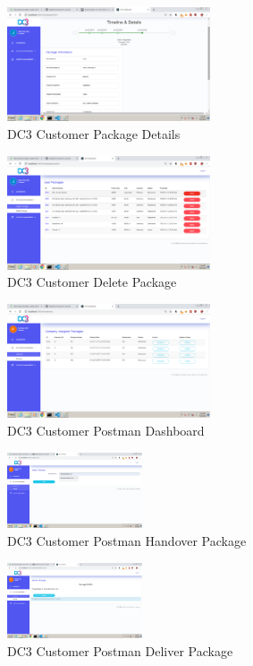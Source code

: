 \begin{figure}[htp]
    \centering
    \includegraphics[width=6cm]{images/screenshots/Customer_Package_Details.png}
    \caption{DC3 Customer Package Details}
    \label{fig:}
\end{figure}


\begin{figure}[htp]
    \centering
    \includegraphics[width=6cm]{images/screenshots/Customer_Delete_Package.png}
    \caption{DC3 Customer Delete Package}
    \label{fig:}
\end{figure}

\begin{figure}[htp]
    \centering
    \includegraphics[width=6cm]{images/screenshots/Postman_Dashboard.png}
    \caption{DC3 Customer Postman Dashboard}
    \label{fig:}
\end{figure}

\begin{figure}[htp]
    \centering
    \includegraphics[width=4cm]{images/screenshots/Postman_Handover.png}
    \caption{DC3 Customer Postman Handover Package}
    \label{fig:}
\end{figure}

\begin{figure}[htp]
    \centering
    \includegraphics[width=4cm]{images/screenshots/Postman_Delivery.png}
    \caption{DC3 Customer Postman Deliver Package}
    \label{fig:}
\end{figure}

